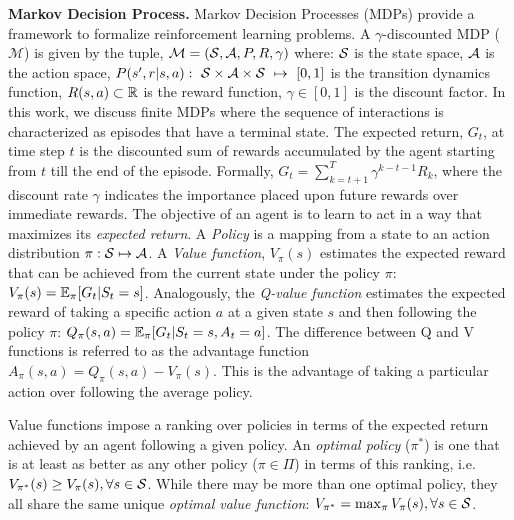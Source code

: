 \textbf{Markov Decision Process.}
Markov Decision Processes (MDPs) provide a framework to formalize reinforcement learning problems.
A $\gamma$-discounted MDP ($\mathcal{M}$) is given by the tuple, $\mathcal{M}=(\mathcal{S}, \mathcal{A}, P, R,
	\gamma)$ where: $\mathcal{S}$ is the state space, $\mathcal{A}$ is the action space,
$P(s',r|s,a):~\mathcal{S}\times\mathcal{A}\times\mathcal{S}~\mapsto~[0,1]$ is the transition dynamics function,
$R(s,a) \subset \mathbb{R}$ is the reward function, $\gamma \in [0,1]$ is the discount factor.
In this work, we discuss finite MDPs where the sequence of interactions is characterized as
episodes that have a terminal state.
The expected return, $G_t$, at time step $t$ is the discounted sum of rewards accumulated by the
agent starting from $t$ till the end of the episode.
Formally, $G_t = \sum_{k=t+1}^{T} \gamma^{k-t-1} R_k$, where the discount rate $\gamma$ indicates
the importance placed upon future rewards over immediate rewards.
The objective of an agent is to learn to act in a way that maximizes its \textit{expected return}.
A \textit{Policy} is a mapping from a state to an action distribution $\pi: \mathcal{S} \mapsto \mathcal{A}$.
A \textit{Value function}, $V_{\pi}(s)$ estimates the expected reward that can be achieved from the
current state under the policy $\pi$: $V_{\pi}(s) = \mathbb{E}_{\pi}[G_t | S_t = s]$.
Analogously, the \textit{Q-value function} estimates the expected reward of taking a specific
action $a$ at a given state $s$ and then following the policy $\pi$: $ Q_{\pi}(s, a) = \mathbb{E}_{\pi}[G_t
		| S_t = s, A_t = a] $.
The difference between Q and V functions is referred to as the advantage function $A_\pi(s,a) =
	Q_\pi(s,a) - V_\pi(s)$.
This is the advantage of taking a particular action over following the average policy.

Value functions impose a ranking over policies in terms of the expected return achieved by an agent
following a given policy.
An \textit{optimal policy} ($\pi^\ast$) is one that is at least as better as any other policy ($\pi
	\in \Pi$) in terms of this ranking, i.e. $V_{\pi^\ast}(s) \geq V_\pi(s), \forall s \in \mathcal{S}$.
While there may be more than one optimal policy, they all share the same unique \textit{optimal
	value function}: $V_{\pi^{\ast}} = \max_{\pi} V_\pi(s), \forall s \in \mathcal{S}$.

